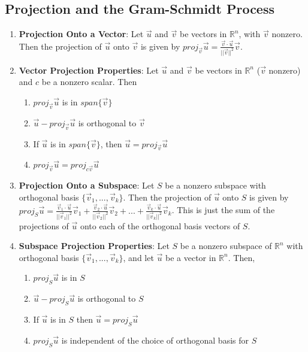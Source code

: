 \documentclass[10pt]{article}
\begin{document}
\subsection{Projection and the Gram-Schmidt Process}
\begin{enumerate}
\item \textbf{Projection Onto a Vector}: Let $\vec{u}$ and $\vec{v}$ be vectors in $\mathbb{R}^n$, with $\vec{v}$ nonzero. Then the projection of $\vec{u}$ onto $\vec{v}$ is given by $proj_{\vec{v}}\vec{u} = \frac{\vec{v} \cdot \vec{u}}{||\vec{v}||^2}\vec{v}$.
\item \textbf{Vector Projection Properties}: Let $\vec{u}$ and $\vec{v}$ be vectors in $\mathbb{R}^n$ ($\vec{v}$ nonzero) and $c$ be a nonzero scalar. Then
\begin{enumerate}
\item $proj_{\vec{v}}\vec{u}$ is in $span \lbrace \vec{v} \rbrace$
\item $\vec{u} - proj_{\vec{v}}\vec{u}$ is orthogonal to $\vec{v}$
\item If $\vec{u}$ is in $span \lbrace \vec{v} \rbrace$, then $\vec{u} = proj_{\vec{v}}\vec{u}$
\item $proj_{\vec{v}}\vec{u} = proj_{c\vec{v}}\vec{u}$
\end{enumerate}
\item \textbf{Projection Onto a Subspace}: Let $S$ be a nonzero subspace with orthogonal basis $\lbrace \vec{v}_1,...,\vec{v}_k \rbrace$. Then the projection of $\vec{u}$ onto $S$ is given by $proj_S\vec{u} = \frac{\vec{v}_1 \cdot \vec{u}}{||\vec{v}_1||^2}\vec{v}_1 + \frac{\vec{v}_2 \cdot \vec{u}}{||\vec{v}_2||^2}\vec{v}_2 + ... + \frac{\vec{v}_k \cdot \vec{u}}{||\vec{v}_k||^2}\vec{v}_k$. This is just the sum of the projections of $\vec{u}$ onto each of the orthogonal basis vectors of $S$.
\item \textbf{Subspace Projection Properties}: Let $S$ be a nonzero subspace of $\mathbb{R}^n$ with orthogonal basis $\lbrace \vec{v}_1,...,\vec{v}_k \rbrace$, and let $\vec{u}$ be a vector in $\mathbb{R}^n$. Then,
\begin{enumerate}
\item $proj_S\vec{u}$ is in $S$
\item $\vec{u} - proj_S\vec{u}$ is orthogonal to $S$
\item If $\vec{u}$ is in $S$ then $\vec{u} = proj_S\vec{u}$
\item $proj_S\vec{u}$ is independent of the choice of orthogonal basis for $S$
\end{enumerate}

\end{enumerate}
\end{document}
